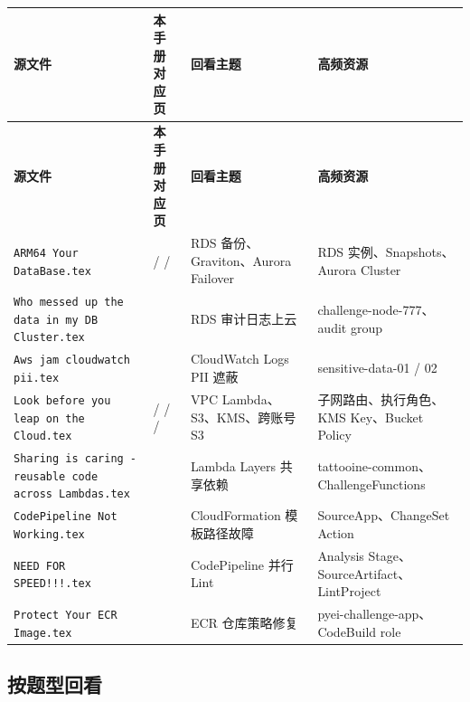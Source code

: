 \documentclass[12pt,a4paper]{article}
\begin{document}
\small
\begin{longtable}{@{}L{4.1cm}L{3.4cm}L{3.7cm}L{2.6cm}@{}}
\textbf{源文件} & \textbf{本手册对应页} & \textbf{回看主题} & \textbf{高频资源} \\
\midrule
\endfirsthead
{}
\textbf{源文件} & \textbf{本手册对应页} & \textbf{回看主题} & \textbf{高频资源} \\
\midrule
\endhead
\texttt{ARM64 Your DataBase.tex} &
\pageref{sec:rds-backup} / \pageref{sec:rds-graviton} / \pageref{sec:aurora-failover} &
RDS 备份、Graviton、Aurora Failover &
RDS 实例、Snapshots、Aurora Cluster \\
\texttt{Who messed up the data in my DB Cluster.tex} &
\pageref{sec:rds-audit} &
RDS 审计日志上云 &
challenge-node-777、audit group \\
\texttt{Aws jam cloudwatch pii.tex} &
\pageref{sec:cloudwatch-pii} &
CloudWatch Logs PII 遮蔽 &
sensitive-data-01 / 02 \\
\texttt{Look before you leap on the Cloud.tex} &
\pageref{sec:vpc-lambda} / \pageref{sec:lambda-s3} / \pageref{sec:kms-lockout} / \pageref{sec:s3-cross-account} &
VPC Lambda、S3、KMS、跨账号 S3 &
子网路由、执行角色、KMS Key、Bucket Policy \\
\texttt{Sharing is caring - reusable code across Lambdas.tex} &
\pageref{sec:lambda-layers} &
Lambda Layers 共享依赖 &
tattooine-common、ChallengeFunctions \\
\texttt{CodePipeline Not Working.tex} &
\pageref{sec:codepipeline-template} &
CloudFormation 模板路径故障 &
SourceApp、ChangeSet Action \\
\texttt{NEED FOR SPEED!!!.tex} &
\pageref{sec:codepipeline-lint} &
CodePipeline 并行 Lint &
Analysis Stage、SourceArtifact、LintProject \\
\texttt{Protect Your ECR Image.tex} &
\pageref{sec:ecr-policy} &
ECR 仓库策略修复 &
pyei-challenge-app、CodeBuild role \\
\bottomrule
\end{longtable}
\normalsize

\subsection{按题型回看}
\end{document}
